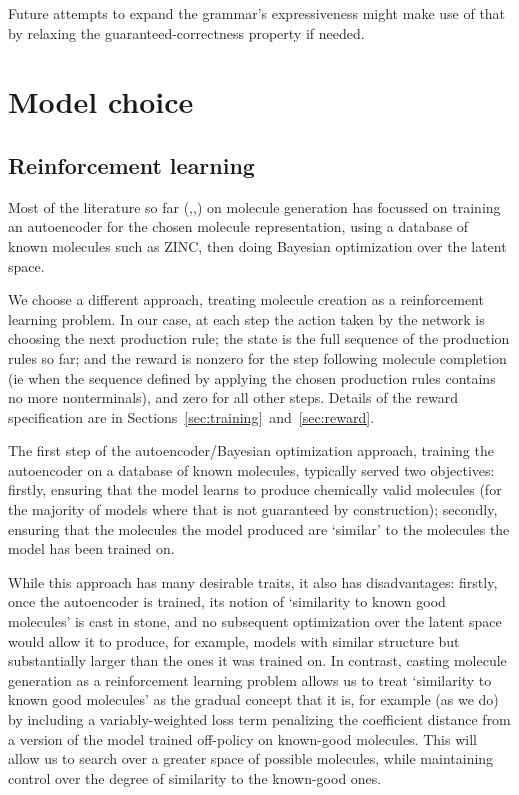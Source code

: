 \documentclass{article}
\begin{document}
Future attempts to expand the grammar's expressiveness might make use of that by relaxing the guaranteed-correctness property if needed.



\section{Model choice}
\subsection{Reinforcement learning}
Most of the literature so far (\cite{Gomez-Bombarelli16},\cite{kusner17},\cite{jin18}) on molecule generation has focussed on training an autoencoder for the chosen molecule representation, using a database of known molecules such as ZINC, then doing Bayesian optimization over the latent space. 

We choose a different approach, treating molecule creation as a reinforcement learning problem. In our case, at each step the action taken by the network is choosing the next production rule; the state is the full sequence of the production rules so far; and the reward is nonzero for the step following molecule completion (ie when the sequence defined by applying the chosen production rules contains no more nonterminals), and zero for all other steps. Details of the reward specification are in Sections~\ref{sec:training}~and~\ref{sec:reward}.

The first step of the autoencoder/Bayesian optimization approach, training the autoencoder on a database of known molecules, typically served two objectives: firstly, ensuring that the model learns to produce chemically valid molecules (for the majority of models where that is not guaranteed by construction); secondly, ensuring that the molecules the model produced are `similar' to the molecules the model has been trained on.

While this approach has many desirable traits, it also has disadvantages: firstly, once the autoencoder is trained, its notion of `similarity to known good molecules' is cast in stone, and no subsequent optimization over the latent space would allow it to produce, for example, models with similar structure but substantially larger than the ones it was trained on. In contrast, casting molecule generation as a reinforcement learning problem allows us to treat `similarity to known good molecules' as the gradual concept that it is, for example (as we do) by including a variably-weighted loss term penalizing the coefficient distance from a version of the model trained off-policy on known-good molecules. This will allow us to search over a greater space of possible molecules, while maintaining control over the degree of similarity to the known-good ones.
\end{document}
